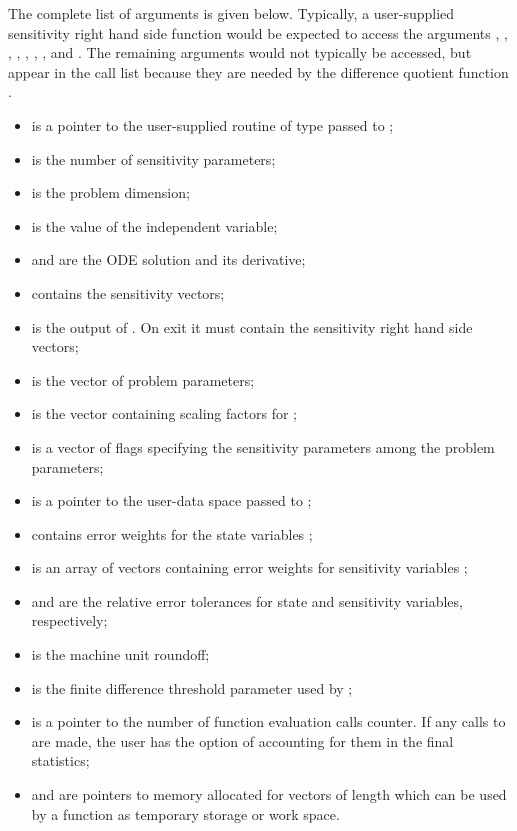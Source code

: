 \begin{itemize}
  The complete list of arguments is given below. Typically, a user-supplied
  sensitivity right hand side function would be expected to access the arguments
  , , , , , , , and .
  The remaining arguments would not typically be accessed, but appear in the 
  call list because they are needed by the difference quotient function 
  .
  \begin{itemize}
  \item {} is a pointer to the user-supplied routine of type  
    passed to ;
  \item {} is the number of sensitivity parameters;
  \item {} is the problem dimension;
  \item {} is the value of the independent variable;
  \item {} and  are the ODE solution and its derivative;
  \item {} contains the  sensitivity vectors;
  \item {} is the output of . On exit it must contain
    the sensitivity right hand side vectors;
  \item {} is the vector of problem parameters;
  \item {} is the vector containing scaling factors for ;
  \item {} is a vector of flags specifying the sensitivity parameters 
    among the problem parameters;
  \item {} is a pointer to the user-data space passed to ;
  \item {} contains error weights for the state variables ;
  \item {} is an array of vectors  containing
    error weights for sensitivity variables ;
  \item {} and  are the relative error tolerances for state 
    and sensitivity variables, respectively;
  \item {} is the machine unit roundoff;
  \item {} is the finite difference threshold parameter used by 
    ;
  \item {} is a pointer to the number of function evaluation
    calls counter. If any calls to  are made, the user has the 
    option of accounting for them in the final {\cvodes} statistics;
  \item {} and  are pointers to memory allocated
    for vectors of length  which can be used by a  
    function as temporary storage or work space.
  \end{itemize}


\end{itemize}
